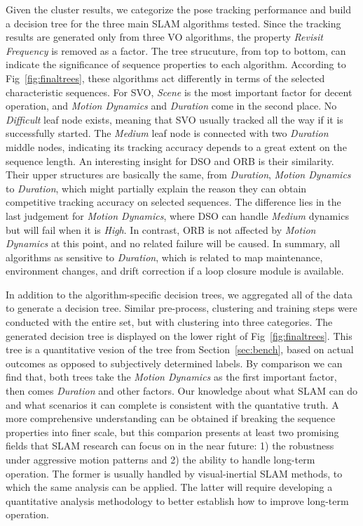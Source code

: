 Given the cluster results, we categorize the pose tracking performance and 
build a decision tree for the three main SLAM algorithms tested. 
Since the tracking results are generated only from three VO algorithms,
the property \textit{Revisit Frequency} is removed as a factor.
The tree strucuture, from top to bottom, can indicate the significance
of sequence properties to each algorithm. 
According to Fig~\ref{fig:finaltrees}, these algorithms act differently
in terms of the selected characteristic sequences. 
For SVO, \textit{Scene} is the most important factor for decent operation, 
and \textit{Motion Dynamics} and \textit{Duration} come in the second place. 
No \textit{Difficult} leaf node exists, meaning that SVO usually tracked all 
the way if it is successfully started. 
The \textit{Medium} leaf node is connected with two \textit{Duration}
middle nodes, indicating its tracking accuracy depends to a great extent
on the sequence length. 
An interesting insight for DSO and ORB is their similarity. 
Their upper structures are basically the same, from \textit{Duration}, \textit{Motion Dynamics} to \textit{Duration}, which might partially explain the reason they can obtain competitive tracking accuracy on selected sequences.
The difference lies in the last judgement for \textit{Motion Dynamics}, where 
DSO can handle \textit{Medium} dynamics but will fail when it is \textit{High}. 
In contrast, ORB is not affected by \textit{Motion Dynamics} at this point, 
and no related failure will be caused. 
In summary, all algorithms as sensitive to \textit{Duration}, which is 
related to map maintenance, environment changes, and drift correction if
a loop closure module is available. 

In addition to the algorithm-specific decision trees, we aggregated all
of the data to generate a decision tree. 
Similar pre-process, clustering and training steps were conducted with the 
entire set, but with clustering into three categories. 
The generated decision tree is displayed on the lower right of
Fig~\ref{fig:finaltrees}. 
This tree is a quantitative vesion of the tree from Section~\ref{sec:bench}, 
based on actual outcomes as opposed to subjectively determined labels.
By comparison we can find that, both trees take the \textit{Motion Dynamics} as 
the first important factor, then comes \textit{Duration} and other factors. 
Our knowledge about what SLAM can do and what scenarios it can complete
is consistent with the quantative truth. 
A more comprehensive understanding can be obtained if breaking the
sequence properties into finer scale, but this comparion presents at
least two promising fields that SLAM research can focus on in the near
future: 
1) the robustness under aggressive motion patterns and 
2) the ability to handle long-term operation.
The former is usually handled by visual-inertial SLAM methods, to which
the same analysis can be applied.  The latter will require developing a
quantitative analysis methodology to better establish how to improve
long-term operation.







